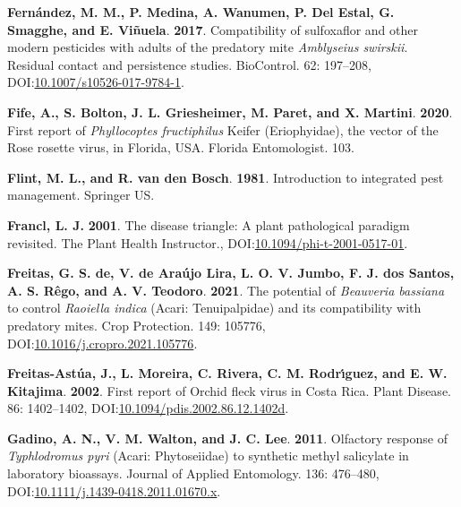 \documentclass[12pt,final,CPage]{ufthesis}
\newlength{\cslhangindent}
\newenvironment{CSLReferences}[2] %
{%
	\setlength{\parindent}{0pt}
	\ifodd #1 \everypar{\setlength{\hangindent}{\cslhangindent}}\ignorespaces\fi
	\ifnum #2 > 0
	\setlength{\parskip}{#2\baselineskip}
	\fi
}%
{}
\begin{document}
{\begin{CSLReferences}{1}{0}
  \leavevmode{}%
  \textbf{Fernández, M. M., P. Medina, A. Wanumen, P. Del Estal, G. Smagghe, and E. Viñuela}. \textbf{2017}. Compatibility of sulfoxaflor and other modern pesticides with adults of the predatory mite {\emph{Amblyseius swirskii}}. Residual contact and persistence studies. {BioControl}. 62: 197--208, DOI:\href{https://doi.org/10.1007/s10526-017-9784-1}{10.1007/s10526-017-9784-1}.

  \leavevmode{}%
  \textbf{Fife, A., S. Bolton, J. L. Griesheimer, M. Paret, and X. Martini}. \textbf{2020}. First report of {\emph{Phyllocoptes fructiphilus}} {Keifer} ({Eriophyidae}), the vector of the {Rose rosette virus}, in {Florida}, {USA}. Florida Entomologist. 103.

  \leavevmode{}%
  \textbf{Flint, M. L., and R. van den Bosch}. \textbf{1981}. Introduction to integrated pest management. Springer {US}.

  \leavevmode{}%
  \textbf{Francl, L. J.} \textbf{2001}. The disease triangle: A plant pathological paradigm revisited. The Plant Health Instructor., DOI:\href{https://doi.org/10.1094/phi-t-2001-0517-01}{10.1094/phi-t-2001-0517-01}.

  \leavevmode{}%
  \textbf{Freitas, G. S. de, V. de Araújo Lira, L. O. V. Jumbo, F. J. dos Santos, A. S. Rêgo, and A. V. Teodoro}. \textbf{2021}. The potential of {\emph{Beauveria bassiana}} to control {\emph{Raoiella indica}} ({Acari}: {Tenuipalpidae}) and its compatibility with predatory mites. Crop Protection. 149: 105776, DOI:\href{https://doi.org/10.1016/j.cropro.2021.105776}{10.1016/j.cropro.2021.105776}.

  \leavevmode{}%
  \textbf{Freitas-Astúa, J., L. Moreira, C. Rivera, C. M. Rodrı́guez, and E. W. Kitajima}. \textbf{2002}. First report of {Orchid fleck virus} in {Costa Rica}. Plant Disease. 86: 1402--1402, DOI:\href{https://doi.org/10.1094/pdis.2002.86.12.1402d}{10.1094/pdis.2002.86.12.1402d}.

  \leavevmode{}%
  \textbf{Gadino, A. N., V. M. Walton, and J. C. Lee}. \textbf{2011}. Olfactory response of {\emph{Typhlodromus pyri}} {({Acari}: {Phytoseiidae})} to synthetic methyl salicylate in laboratory bioassays. Journal of Applied Entomology. 136: 476--480, DOI:\href{https://doi.org/10.1111/j.1439-0418.2011.01670.x}{10.1111/j.1439-0418.2011.01670.x}.


\end{CSLReferences}}
\end{document}

